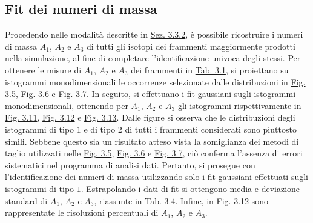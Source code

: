 \documentclass[12pt,a4paper,twoside]{report}
\begin{document}
	\subsection{Fit dei numeri di massa}
	Procedendo nelle modalità descritte in \hyperref[sec:selection_number_of_mass]{Sez. 3.3.2}, è possibile ricostruire i numeri di massa $A_1$, $A_2$ e $A_3$ di tutti gli isotopi dei frammenti maggiormente prodotti nella simulazione, al fine di completare l'identificazione univoca degli stessi. Per ottenere le misure di $A_1$, $A_2$ e $A_3$ dei frammenti in \hyperref[tab:fragments]{Tab. 3.1}, si proiettano su istogrammi monodimensionali le occorrenze selezionate dalle distribuzioni in \hyperref[fig:a1_cut]{Fig. 3.5}, \hyperref[fig:a2_cut]{Fig. 3.6} e \hyperref[fig:a3_cut]{Fig. 3.7}. In seguito, si effettuano i fit gaussiani sugli istogrammi monodimensionali, ottenendo per $A_1$, $A_2$ e $A_3$ gli istogrammi rispettivamente in \hyperref[fig:a1_fragments_final]{Fig. 3.11}, \hyperref[fig:a2_fragments_final]{Fig. 3.12} e \hyperref[fig:a3_fragments_final]{Fig. 3.13}. Dalle figure si osserva che le distribuzioni degli istogrammi di tipo $1$ e di tipo $2$ di tutti i frammenti considerati sono piuttosto simili. Sebbene questo sia un risultato atteso vista la somiglianza dei metodi di taglio utilizzati nelle \hyperref[fig:a1_cut]{Fig. 3.5}, \hyperref[fig:a2_cut]{Fig. 3.6} e \hyperref[fig:a3_cut]{Fig. 3.7}, ciò conferma l'assenza di errori sistematici nel programma di analisi dati. Pertanto, si prosegue con l'identificazione dei numeri di massa utilizzando solo i fit gaussiani effettuati sugli istogrammi di tipo $1$. Estrapolando i dati di fit si ottengono media e deviazione standard di $A_1$, $A_2$ e $A_3$, riassunte in \hyperref[tab:mass_numbers]{Tab. 3.4}. Infine, in \hyperref[fig:number_mass_resolution]{Fig. 3.12} sono rappresentate le risoluzioni percentuali di $A_1$, $A_2$ e $A_3$.
\end{document}

